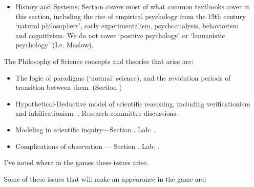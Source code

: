 \begin{refsection}
\begin{itemize}
\item History and Systems: Section  covers most of what common textbooks cover in this section, including the rise of empirical psychology from the 19th century ‘natural philosophers’, early experimentalism, psychoanalysis, behaviorism and cognitivism. We do not cover ‘positive psychology’ or ‘humanistic psychology’ (I.e. Maslow).

\end{itemize}

The Philosophy of Science concepts and theories that arise are:

\begin{itemize}
\item The logic of paradigms (`normal' science), and the revolution periods of transition between them. (Section )

\item Hypothetical-Deductive model of scientific reasoning, including verificationism and falsificationism. , Research committee discussions.

\item Modeling in scientific inquiry---Section . Lab: .

\item Complications of observation --- Section . Lab: .

\end{itemize}

I've noted where in the games these issues arise.

Some of these issues that will make an appearance in the game are:

 \begin{longtable}[!t]{ | P{4cm} | P{3cm} |  P{10cm} | }
\hline


\end{longtable}
\end{refsection}
